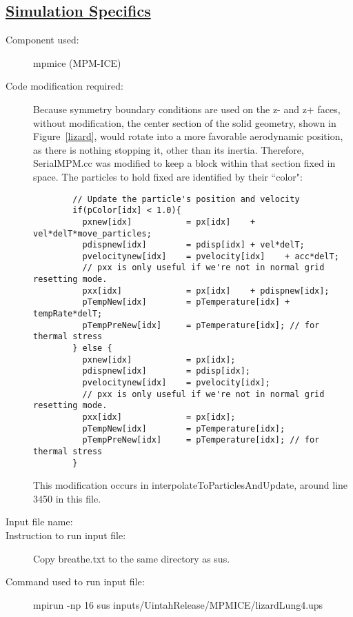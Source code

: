 \subsection*{\underline{Simulation Specifics}}
\begin{description}
\item [Component used:] \hfill mpmice (MPM-ICE)
\item [Code modification required:]

Because symmetry boundary conditions are used on the z- and z+ faces, without
modification, the center section of the solid geometry, shown in
Figure~\ref{lizard}, would rotate into a more favorable aerodynamic position,
as there is nothing stopping it, other than its inertia.  Therefore,
SerialMPM.cc was modified to keep a block within that section fixed in space.
The particles to hold fixed are identified by their ``color":

\begin{verbatim}
        // Update the particle's position and velocity
        if(pColor[idx] < 1.0){
          pxnew[idx]           = px[idx]    + vel*delT*move_particles;
          pdispnew[idx]        = pdisp[idx] + vel*delT;
          pvelocitynew[idx]    = pvelocity[idx]    + acc*delT;
          // pxx is only useful if we're not in normal grid resetting mode.
          pxx[idx]             = px[idx]    + pdispnew[idx];
          pTempNew[idx]        = pTemperature[idx] + tempRate*delT;
          pTempPreNew[idx]     = pTemperature[idx]; // for thermal stress
        } else {
          pxnew[idx]           = px[idx];
          pdispnew[idx]        = pdisp[idx];
          pvelocitynew[idx]    = pvelocity[idx];
          // pxx is only useful if we're not in normal grid resetting mode.
          pxx[idx]             = px[idx];
          pTempNew[idx]        = pTemperature[idx];
          pTempPreNew[idx]     = pTemperature[idx]; // for thermal stress
        }
\end{verbatim}

This modification occurs in interpolateToParticlesAndUpdate, around line 3450
in this file.

\item [Input file name:] \hfill {}
\item [Instruction to run input file:] \hfill \newline Copy breathe.txt to the same directory as sus.
\item [Command used to run input file:]\hfill 
mpirun -np 16 sus inputs/UintahRelease/MPMICE/lizardLung4.ups


\end{description}
